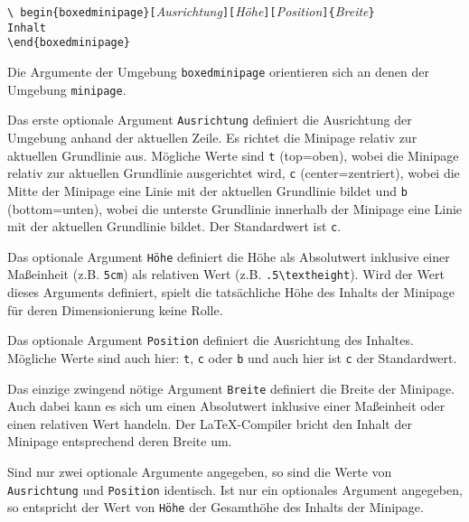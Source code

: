 \begin{boxedminipage}{\textwidth}
\texttt{\textbackslash
begin\{boxedminipage\}[}\textsl{Ausrichtung}\texttt{][}\textsl{Höhe}\texttt{][}\textsl{Position}\texttt{]\{}\textsl{Breite}\texttt{\} \\
Inhalt \\
\textbackslash end\{boxedminipage\}}
\end{boxedminipage}


Die Argumente der Umgebung \verb!boxedminipage! orientieren sich an denen der Umgebung \verb!minipage!.

Das erste optionale Argument \verb!Ausrichtung! definiert die Ausrichtung der Umgebung anhand der aktuellen Zeile. Es richtet die Minipage relativ zur aktuellen Grundlinie aus. Mögliche Werte sind \verb!t! (top=oben), wobei die Minipage relativ zur aktuellen Grundlinie ausgerichtet wird, \verb!c! (center=zentriert), wobei die Mitte der Minipage eine Linie mit der aktuellen Grundlinie bildet und \verb!b! (bottom=unten), wobei die unterste Grundlinie innerhalb der Minipage eine Linie mit der aktuellen Grundlinie bildet. Der Standardwert ist \verb!c!.~\cite{goLaTeX_minipage_Webpage}

Das optionale Argument \verb!Höhe! definiert die Höhe als Absolutwert inklusive einer Maßeinheit (z.B. \verb!5cm!) als relativen Wert (z.B. \verb!.5\textheight!). Wird der Wert dieses Arguments definiert, spielt die tatsächliche Höhe des Inhalts der Minipage für deren Dimensionierung keine Rolle. 

Das optionale Argument \verb!Position! definiert die Ausrichtung des Inhaltes. Mögliche Werte sind auch hier: \verb!t!, \verb!c! oder \verb!b! und auch hier ist \verb!c! der Standardwert.

Das einzige zwingend nötige Argument \verb!Breite! definiert die Breite der Minipage. Auch dabei kann es sich um einen Absolutwert inklusive einer Maßeinheit oder einen relativen Wert handeln. Der \LaTeX-Compiler bricht den Inhalt der Minipage entsprechend deren Breite um.

Sind nur zwei optionale Argumente angegeben, so sind die Werte von \verb!Ausrichtung! und \verb!Position! identisch. 
Ist nur ein optionales Argument angegeben, so entspricht der Wert von \verb!Höhe! der Gesamthöhe des Inhalts der Minipage.

